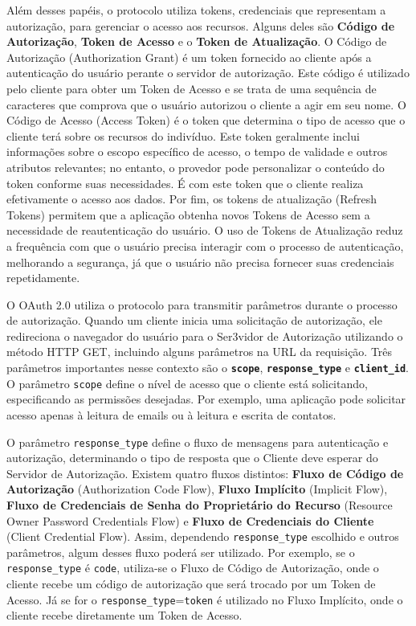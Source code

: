 Além desses papéis, o protocolo utiliza tokens, credenciais que representam a autorização, para gerenciar o acesso aos recursos. Alguns deles são \textbf{Código de Autorização}, \textbf{Token de Acesso} e o \textbf{Token de Atualização}. O Código de Autorização (Authorization Grant) é um token fornecido ao cliente após a autenticação do usuário perante o servidor de autorização. Este código é utilizado pelo cliente para obter um Token de Acesso e se trata de uma sequência de caracteres que comprova que o usuário autorizou o cliente a agir em seu nome. O Código de Acesso (Access Token) é o token que determina o tipo de acesso que o cliente terá sobre os recursos do indivíduo. Este token geralmente inclui informações sobre o escopo específico de acesso, o tempo de validade e outros atributos relevantes; no entanto, o provedor pode personalizar o conteúdo do token conforme suas necessidades. É com este token que o cliente realiza efetivamente o acesso aos dados. Por fim, os tokens de atualização (Refresh Tokens) permitem que a aplicação obtenha novos Tokens de Acesso sem a necessidade de reautenticação do usuário. O uso de Tokens de Atualização reduz a frequência com que o usuário precisa interagir com o processo de autenticação, melhorando a segurança, já que o usuário não precisa fornecer suas credenciais repetidamente.

O OAuth 2.0 utiliza o protocolo  para transmitir parâmetros durante o processo de autorização. Quando um cliente inicia uma solicitação de autorização, ele redireciona o navegador do usuário para o Ser3vidor de Autorização utilizando o método \acs{HTTP} GET, incluindo alguns parâmetros na URL da requisição. Três parâmetros importantes nesse contexto são o \textbf{\texttt{\texttt{scope}}}, \textbf{\texttt{response\_type}} e \textbf{\texttt{client\_id}}. O parâmetro \texttt{scope} define o nível de acesso que o cliente está solicitando, especificando as permissões desejadas. Por exemplo, uma aplicação pode solicitar acesso apenas à leitura de emails ou à leitura e escrita de contatos. 

O parâmetro \texttt{response\_type} define o fluxo de mensagens para autenticação e autorização, determinando o tipo de resposta que o Cliente deve esperar do Servidor de Autorização. Existem quatro fluxos distintos: \textbf{Fluxo de Código de Autorização} (Authorization Code Flow), \textbf{Fluxo Implícito} (Implicit Flow), \textbf{Fluxo de Credenciais de Senha do Proprietário do Recurso} (Resource Owner Password Credentials Flow) e \textbf{Fluxo de Credenciais do Cliente} (Client Credential Flow). Assim, dependendo \texttt{response\_type} escolhido e outros parâmetros, algum desses fluxo poderá ser utilizado. Por exemplo, se o \texttt{response\_type} é \texttt{code}, utiliza-se o Fluxo de Código de Autorização, onde o cliente recebe um código de autorização que será trocado por um Token de Acesso. Já se for o \texttt{response\_type}=\texttt{token} é utilizado no Fluxo Implícito, onde o cliente recebe diretamente um Token de Acesso.


